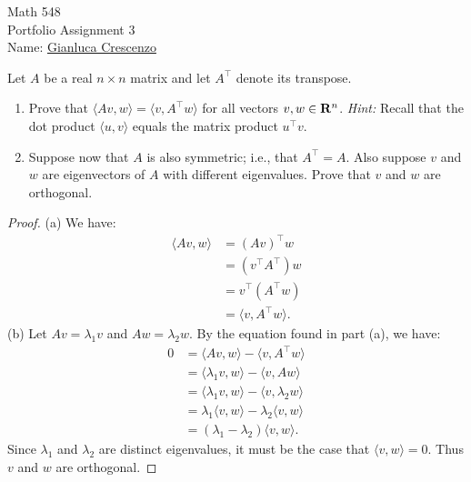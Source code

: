 \documentclass[10pt,twoside,openany]{memoir}
\begin{document}
\begin{center}
    {\Large Math 548 \\[0.1in]Portfolio Assignment 3}\\[.175in]
    {Name:} {\underline{Gianluca Crescenzo\hspace*{2in}}}\\[0.15in]
    \end{center}
    \vspace{4pt}
\begin{problem}[W20, P1]
Let $A$ be a real $n \times n$ matrix and let $A^\top$ denote its transpose.
\begin{enumerate}[label = (\alph*),itemsep=1pt,topsep=3pt]
    \item Prove that $\langle Av,w \rangle = \langle v,A^\top w \rangle$ for all vectors $v,w \in \mathbf{R}^n$. \textit{Hint:} Recall that the dot product $\langle u,v \rangle$ equals the matrix product $u^\top v$.
    \item Suppose now that $A$ is also symmetric; i.e., that $A^\top = A$. Also suppose $v$ and $w$ are eigenvectors of $A$ with different eigenvalues. Prove that $v$ and $w$ are orthogonal.
\end{enumerate}
\end{problem}
    {\color{blue} \begin{proof}
        (a) We have:
            \begin{equation*}
            \begin{split}
                \langle Av,w \rangle
                & = (Av)^\top w \\
                & = (v^\top A^\top) w \\
                & = v^\top (A^\top w) \\
                & = \langle v,A^\top w \rangle.
            \end{split}
            \end{equation*}
        (b) Let $Av = \lambda_1 v$ and $A w = \lambda_2 w$. By the equation found in part (a), we have:
            \begin{equation*}
            \begin{split}
                0
                & = \langle Av,w \rangle - \langle v,A^\top w \rangle \\
                & = \langle \lambda_1 v,w \rangle - \langle v,A w \rangle \\
                & = \langle \lambda_1 v,w \rangle - \langle v,\lambda_2 w \rangle \\
                & = \lambda_1 \langle v,w \rangle - \lambda_2 \langle v,w \rangle \\
                & = (\lambda_1 - \lambda_2)\langle v,w \rangle.
            \end{split}
            \end{equation*}
        Since $\lambda_1$ and $\lambda_2$ are distinct eigenvalues, it must be the case that $\langle v,w \rangle = 0$. Thus $v$ and $w$ are orthogonal.
    \end{proof}}
\end{document}
